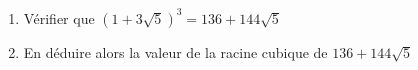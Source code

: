 
 \begin{enumerate}
 \item Vérifier que $\left(1+3\sqrt 5 \right) ^3= 136+144\sqrt 5$
  \item En déduire alors la valeur de la racine cubique de $136+144\sqrt 5$
 \end{enumerate}

